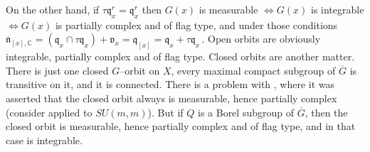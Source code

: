 \documentclass{conm-p-l}
\newcommand{\gq}{\mathfrak{q}}
\def\gn{\mathfrak{n}}
\def\gq{\mathfrak{q}}
\def\gv{\mathfrak{v}}
\def\C{\mathbb{C}}
\begin{document}
On the other hand, if 
$\tau\gq_x^r = \gq_x^r$ then \cite[Theorem 9.19]{W1969} $G(x)$ is measurable
$\Leftrightarrow G(x)$ is integrable $\Leftrightarrow G(x)$ is partially
complex and of flag type, and under those conditions
$\overline{\gn}_{[x],\C} =(\gq_x \cap \tau\gq_x) + \gv_x = \gq_{[x]}
= \gq_x + \tau\gq_x$\,.  Open orbits are obviously integrable, partially
complex and of flag type.  Closed orbits are another matter.  There is just one
closed $G$--orbit on $X$, every maximal compact subgroup of $\overline{G}$
is transitive on it, and it is connected.  There is a problem with 
\cite[Theorem 9.12]{W1969}, where it was asserted that the closed orbit 
always is measurable, hence partially complex (consider 
\cite[Example 8.12]{W1969} applied to $SU(m,m)$).  But if $Q$ is a
Borel subgroup of $\overline{G}$, then the closed orbit is measurable, hence
partially complex and of flag type, and in that case is integrable.
\end{document}
